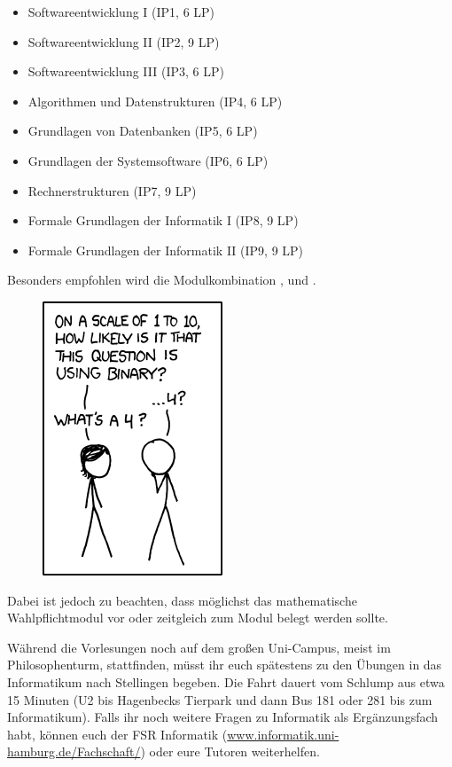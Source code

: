 \begin{itemize}\itemsep 0pt
    \item Softwareentwicklung I (IP1, 6 LP)
    \item Softwareentwicklung II (IP2, 9 LP)
    \item Softwareentwicklung III (IP3, 6 LP)
    \item Algorithmen und Datenstrukturen (IP4, 6 LP)
    \item Grundlagen von Datenbanken (IP5, 6 LP)
    \item Grundlagen der Systemsoftware (IP6, 6 LP)
    \item Rechnerstrukturen (IP7, 9 LP)
    \item Formale Grundlagen der Informatik I (IP8, 9 LP)
    \item Formale Grundlagen der Informatik II (IP9, 9 LP)
\end{itemize}

Besonders empfohlen wird die Modulkombination ,
 und .
\begin{figure}
\includegraphics[scale=.8]{comics/953}
\end{figure}
Dabei ist jedoch zu beachten, dass möglichst das mathematische Wahlpflichtmodul
 vor oder zeitgleich zum Modul  belegt werden sollte.

Während die Vorlesungen noch auf dem großen Uni-Campus, meist im
Philosophenturm, stattfinden, müsst ihr euch spätestens zu den Übungen in das
Informatikum nach Stellingen begeben. Die Fahrt dauert vom Schlump aus etwa 15
Minuten (U2 bis Hagenbecks Tierpark und dann Bus 181 oder 281 bis zum
Informatikum). Falls ihr noch weitere Fragen zu Informatik als Ergänzungsfach
habt, können euch der FSR Informatik
(\url{www.informatik.uni-hamburg.de/Fachschaft/}) oder eure Tutoren
weiterhelfen.

